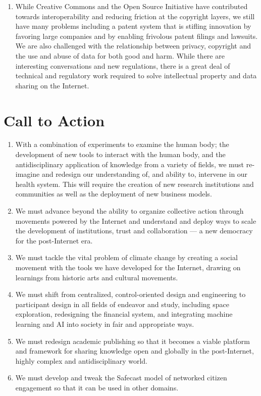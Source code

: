 \begin{enumerate}
\item While Creative Commons and the Open Source Initiative have contributed towards interoperability and reducing friction at the copyright layers, we still have many problems including a patent system that is stifling innovation by favoring large companies and by enabling frivolous patent filings and lawsuits. We are also challenged with the relationship between privacy, copyright and the use and abuse of data for both good and harm. While there are interesting conversations and new regulations, there is a great deal of technical and regulatory work required to solve intellectual property and data sharing on the Internet.
\end{enumerate}

\section{Call to Action}
\begin{enumerate}
\item With a combination of experiments to examine the human body; the development of new tools to interact with the human body, and the antidisciplinary application of knowledge from a variety of fields, we must re-imagine and redesign our understanding of, and ability to, intervene in our health system. This will require the creation of new research institutions and communities as well as the deployment of new business models.
\item We must advance beyond the ability to organize collective action through movements powered by the Internet and understand and deploy ways to scale the development of institutions, trust and collaboration --- a new democracy for the post-Internet era.
\item We must tackle the vital problem of climate change by creating a social movement with the tools we have developed for the Internet, drawing on learnings from historic arts and cultural movements.
\item We must shift from centralized, control-oriented design and engineering to participant design in all fields of endeavor and study, including space exploration, redesigning the financial system, and integrating machine learning and AI into society in fair and appropriate ways.
\item We must redesign academic publishing so that it becomes a viable platform and framework for sharing knowledge open and globally in the post-Internet, highly complex and antidisciplinary world.
\item We must develop and tweak the Safecast model of networked citizen engagement so that it can be used in other domains.
\end{enumerate}

